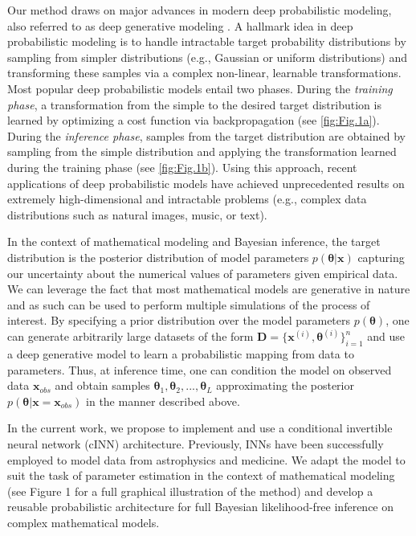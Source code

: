 \documentclass[9pt,twoside,lineno]{pnas-new}
\begin{document}
Our method draws on major advances in modern deep probabilistic modeling, also referred to as deep generative modeling \cite{bloem2019probabilistic, kingma2018glow, ardizzone2018analyzing, kingma2014auto}. A hallmark idea in deep probabilistic modeling is to handle intractable target probability distributions by sampling from simpler distributions (e.g., Gaussian or uniform distributions) and transforming these samples via a complex non-linear, learnable transformations. Most popular deep probabilistic models entail two phases. During the \textit{training phase}, a transformation from the simple to the desired target distribution is learned by optimizing a cost function via backpropagation (see \autoref{fig:Fig.1a}). During the \textit{inference phase}, samples from the target distribution are obtained by sampling from the simple distribution and applying the transformation learned during the training phase (see \autoref{fig:Fig.1b}). Using this approach, recent applications of deep probabilistic models have achieved unprecedented results on extremely high-dimensional and intractable problems (e.g., complex data distributions such as natural images, music, or text).

In the context of mathematical modeling and Bayesian inference, the target distribution is the posterior distribution of model parameters $p(\boldsymbol{\theta}|\boldsymbol{x})$ capturing our uncertainty about the numerical values of parameters given empirical data. We can leverage the fact that most mathematical models are generative in nature and as such can be used to perform multiple simulations of the process of interest. By specifying a prior distribution over the model parameters $p(\boldsymbol{\theta})$, one can generate arbitrarily large datasets of the form $\boldsymbol{D} = \{\boldsymbol{x}^{(i)}, \boldsymbol{\theta}^{(i)}\}_{i=1}^{n}$ and use a deep generative model to learn a probabilistic mapping from data to parameters. Thus, at inference time, one can condition the model on observed data $\boldsymbol{x}_{obs}$ and obtain samples $\boldsymbol{\theta}_{1}, \boldsymbol{\theta}_{2},...,\boldsymbol{\theta}_{L}$  approximating the posterior $p(\boldsymbol{\theta}|\boldsymbol{x}=\boldsymbol{x}_{obs})$ in the manner described above.

In the current work, we propose to implement and use a conditional invertible neural network (cINN) architecture. Previously, INNs have been successfully employed to model data from astrophysics and medicine\cite{ardizzone2018analyzing}. We adapt the model to suit the task of parameter estimation in the context of mathematical modeling (see Figure 1 for a full graphical illustration of the method) and develop a reusable probabilistic architecture for full Bayesian likelihood-free inference on complex mathematical models.
\end{document}
